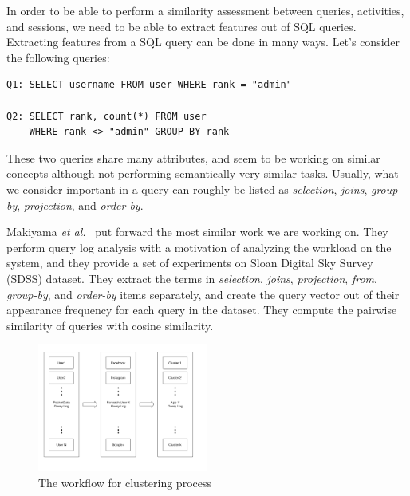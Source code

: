 In order to be able to perform a similarity assessment between queries, activities, and sessions, we need to be able to extract features out of SQL queries.
Extracting features from a SQL query can be done in many ways. Let's consider the following queries:

\begin{verbatim}
Q1: SELECT username FROM user WHERE rank = "admin"
 
Q2: SELECT rank, count(*) FROM user
    WHERE rank <> "admin" GROUP BY rank
\end{verbatim}

These two queries share many attributes, and seem to be working on similar concepts although not performing semantically very similar tasks. Usually, what we consider important in a query can roughly be listed as \textit{selection}, \textit{joins}, \textit{group-by}, \textit{projection}, and \textit{order-by}.

Makiyama \textit{et al.}~\cite{makiyama2015text} put forward the most similar work we are working on. They perform query log analysis with a motivation of analyzing the workload on the system, and they provide a set of experiments on Sloan Digital Sky Survey (SDSS) dataset. They extract the terms in \textit{selection}, \textit{joins}, \textit{projection}, \textit{from}, \textit{group-by}, and \textit{order-by} items separately, and create the query vector out of their appearance frequency for each query in the dataset. They compute the pairwise similarity of queries with cosine similarity.

\begin{figure}[h!]
    \centering
    \includegraphics[width=0.5\textwidth]{graphics/clustering}
    \caption{The workflow for clustering process}
    \label{fig:clusteringWorkflow}
\end{figure}


